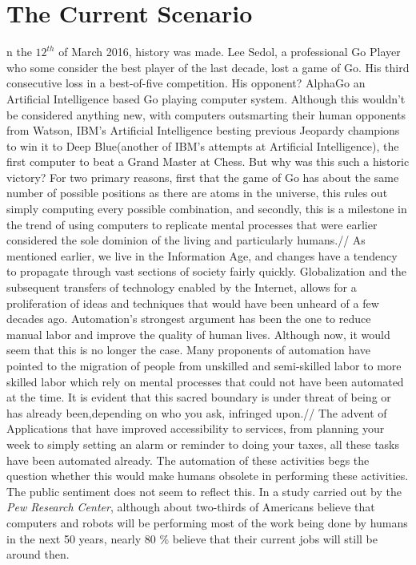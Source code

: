 \section{The Current Scenario}
\label{sec:-current}
n the $12^{th}$ of March 2016, history was made. Lee Sedol, a professional Go Player who some consider the best player of the last decade, lost a game of Go. His third consecutive loss in a best-of-five competition. His opponent? AlphaGo an Artificial Intelligence based Go playing computer system. Although this wouldn't be considered anything new, with computers outsmarting their human opponents from Watson, IBM's Artificial Intelligence besting previous Jeopardy champions to win it to Deep Blue(another of IBM's attempts at Artificial Intelligence), the first computer to beat a Grand Master at Chess. But why was this such a historic victory? For two primary reasons, first that the game of Go has about the same number of possible positions as there are atoms in the universe, this rules out simply computing every possible combination, and secondly, this is a milestone in the trend of using computers to replicate mental processes that were earlier considered the sole dominion of the living and particularly humans.//
	As mentioned earlier, we live in the Information Age, and changes have a tendency to propagate through vast sections of society fairly quickly. Globalization and the subsequent transfers of technology enabled by the Internet, allows for a proliferation of ideas and techniques that would have been unheard of a few decades ago. Automation's strongest argument has been the one to reduce manual labor and improve the quality of human lives. Although now, it would seem that this is no longer the case. Many proponents of automation have pointed to the migration of people from unskilled and semi-skilled labor to more skilled labor which rely on mental processes that could not have been automated at the time. It is evident that this sacred boundary is under threat of being or has already been,depending on who you ask, infringed upon.//
	The advent of Applications that have improved accessibility to services, from planning your week to simply setting an alarm or reminder to doing your taxes, all these tasks have been automated already. The automation of these activities begs the question whether this would make humans obsolete in performing these activities. The public sentiment does not seem to reflect this. In a study carried out by the \textit{Pew Research Center}\cite{workforcepew}, although about two-thirds of Americans believe that computers and robots will be performing most of the work being done by humans in the next 50 years, nearly 80 \% believe that their current jobs will still be around then.\\
